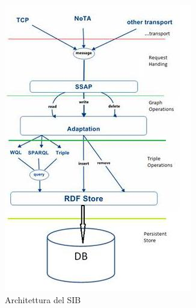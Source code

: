 \begin{figure}[H]
        \centering
        \begin{subfigure}[H]{0.5\textwidth}
                \includegraphics[width=\textwidth]{assets/sib-architecture-2.jpg}
                \caption{Architettura del SIB}
                \label{fig:sib-architecture}
        \end{subfigure}%
        \begin{subfigure}[H]{0.42\textwidth}

\end{subfigure}
\end{figure}

